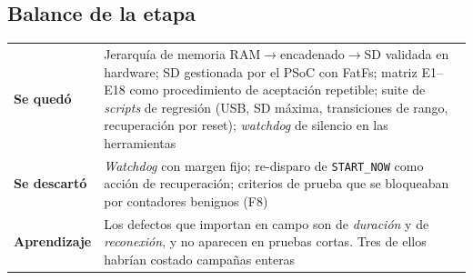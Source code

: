 \subsection{Balance de la etapa}

\begin{center}\small
\begin{tabularx}{\textwidth}{@{}l X@{}}
\toprule
\textbf{Se qued\'o} & Jerarqu\'ia de memoria RAM$\to$encadenado$\to$SD validada en hardware; SD gestionada por el PSoC con FatFs; matriz E1--E18 como procedimiento de aceptaci\'on repetible; suite de \emph{scripts} de regresi\'on (USB, SD m\'axima, transiciones de rango, recuperaci\'on por reset); \emph{watchdog} de silencio en las herramientas \\
\addlinespace[3pt]
\textbf{Se descart\'o} & \emph{Watchdog} con margen fijo; re-disparo de \texttt{START\_NOW} como acci\'on de recuperaci\'on; criterios de prueba que se bloqueaban por contadores benignos (F8) \\
\addlinespace[3pt]
\textbf{Aprendizaje} & Los defectos que importan en campo son de \emph{duraci\'on} y de \emph{reconexi\'on}, y no aparecen en pruebas cortas. Tres de ellos habr\'ian costado campa\~nas enteras \\
\bottomrule
\end{tabularx}
\end{center}
